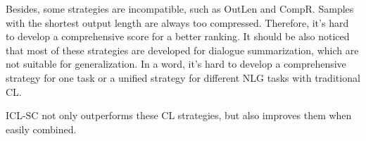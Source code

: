 Besides, some strategies 
are incompatible, such as OutLen and CompR. Samples with the shortest output length are always too compressed. Therefore, it's hard to develop a comprehensive score for a better ranking. It should be also noticed that most of these strategies are developed for dialogue summarization, which are not suitable for generalization. In a word, it's hard to develop a 
comprehensive strategy for one task or a unified strategy for different NLG tasks with traditional CL. 

ICL-SC not only outperforms these CL strategies, but also improves them when easily combined. 

\label{sec:tracl}






